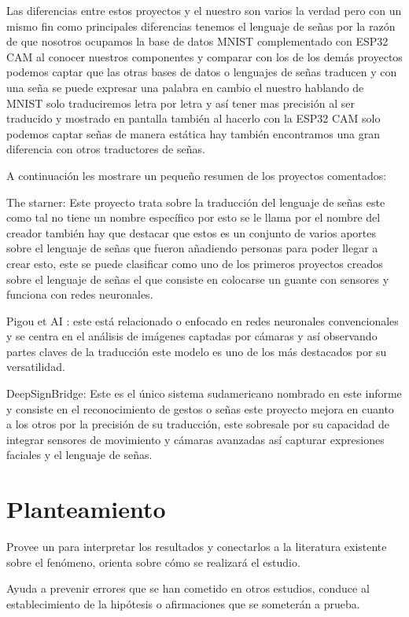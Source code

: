 \documentclass[letter,12pt]{report}
\begin{document}
Las diferencias entre estos proyectos y el nuestro son varios la verdad pero con un mismo fin como principales diferencias tenemos el lenguaje de señas por la razón de que nosotros ocupamos la base de datos MNIST complementado con ESP32 CAM al conocer nuestros componentes y comparar con los de los demás proyectos podemos captar que las otras bases de datos o lenguajes de señas traducen y con una seña se puede expresar una palabra en cambio el nuestro hablando de MNIST solo traduciremos letra por letra y así tener mas precisión al  ser traducido y mostrado en pantalla también al hacerlo con la ESP32 CAM solo podemos captar señas de manera estática hay también encontramos una gran diferencia con otros traductores de señas.  
 
A continuación les mostrare un pequeño resumen de los proyectos comentados:

The starner: Este proyecto trata sobre la traducción del lenguaje  de señas este como tal no tiene un nombre específico por esto se le llama por el nombre del creador también hay que destacar que estos es un conjunto de varios aportes sobre el lenguaje de señas que fueron añadiendo personas para poder llegar a crear esto, este se puede clasificar como uno de los primeros proyectos creados sobre el lenguaje de señas el que consiste en colocarse un guante con sensores y funciona con redes neuronales.

Pigou et AI : este está relacionado o enfocado en redes neuronales convencionales y se centra en el análisis de imágenes captadas por cámaras y así observando partes claves de la traducción este modelo es uno de los más destacados por su versatilidad.

DeepSignBridge: Este es el único sistema sudamericano nombrado en este informe y consiste en el reconocimiento de gestos o señas este proyecto mejora en cuanto a los otros por la precisión de su traducción, este sobresale por su capacidad de integrar sensores de movimiento y cámaras avanzadas así capturar expresiones faciales y el lenguaje de señas.   


\section{Planteamiento}

Provee un  para interpretar los resultados y conectarlos a la literatura existente sobre el fenómeno, orienta sobre cómo se realizará el estudio.

 Ayuda a prevenir errores que se han cometido en otros estudios, conduce al establecimiento de la hipótesis o afirmaciones que se someterán a prueba.
 
\end{document}
